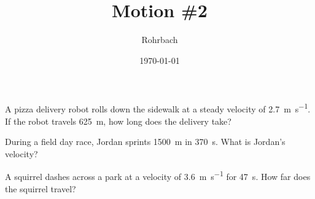 \documentclass[10pt]{exam}
\title{Motion \#2}
\author{Rohrbach}
\date{\today}
\begin{document}
\maketitle

\begin{questions}

  \question
    A pizza delivery robot rolls down the sidewalk at a steady velocity of \SI{2.7}{\meter\per\second}. If the robot travels \SI{625}{\meter}, how long does the delivery take?
    \vs

  \question
    During a field day race, Jordan sprints \SI{1500}{\meter} in \SI{370}{\second}. What is Jordan's velocity?
    \vs

  \question
    A squirrel dashes across a park at a velocity of \SI{3.6}{\meter\per\second} for \SI{47}{\second}. How far does the squirrel travel?
    \vs

\end{questions}
\end{document}

